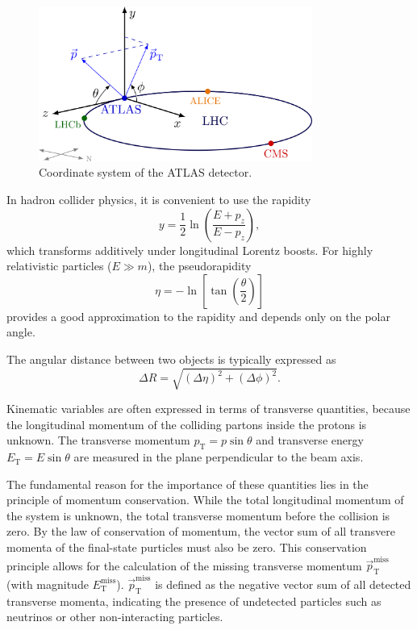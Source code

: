 \begin{figure}[!htb]
\begin{center}
\includegraphics[width=0.8\textwidth]{figures/atlas_coordinate_system.png}\caption{Coordinate system of the ATLAS detector.} %
\label{fig:atlas_coordinates}
\end{center}
\end{figure}


In hadron collider physics, it is convenient to use the rapidity
\begin{equation}
y = \frac{1}{2} \ln\left(\frac{E + p_z}{E - p_z}\right),
\end{equation}
which transforms additively under longitudinal Lorentz boosts. For highly relativistic particles ($E \gg m$), the pseudorapidity
\begin{equation}
\eta = -\ln\left[\tan\left(\frac{\theta}{2}\right)\right]
\end{equation}
provides a good approximation to the rapidity and depends only on the polar angle.

The angular distance between two objects is typically expressed as
\begin{equation}
\Delta R = \sqrt{(\Delta\eta)^2 + (\Delta\phi)^2}.
\end{equation}

Kinematic variables are often expressed in terms of transverse quantities, because the longitudinal momentum of the colliding partons inside the protons is unknown. The transverse momentum $p_\text{T} = p\sin\theta$ and transverse energy $E_\text{T} = E\sin\theta$ are measured in the plane perpendicular to the beam axis.

The fundamental reason for the importance of these quantities lies in the principle of momentum conservation. While the total longitudinal momentum of the system is unknown, the total transverse momentum before the collision is zero. By the law of conservation of momentum, the vector sum of all transvere momenta of the final-state purticles must also be zero. This conservation principle allows for the calculation of the missing transverse momentum $\vec{p}_\text{T}^\text{miss}$ (with magnitude $E_\text{T}^\text{miss}$). $\vec{p}_\text{T}^\text{miss}$ is defined as the negative vector sum of all detected transverse momenta, indicating the presence of undetected particles such as neutrinos or other non-interacting particles.

